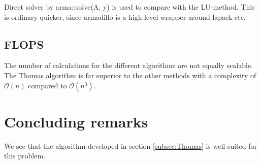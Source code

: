 \documentclass[11pt,a4paper,english,final]{article}
\numberwithin{equation}{section}
\newcommand{\bigO}[1]{\mathcal{O}\left( #1 \right)}
\begin{document}
Direct solver by arma::solve(A, y) is used to compare with the LU-method.
This is ordinary quicker, since armadillo is a high-level wrapper around
lapack etc.

\subsection{FLOPS}
The number of calculations for the different algorithms are not equally
scalable. The Thomas algorithm is far superior to the other methods
with a complexity of $\bigO{n}$ compared to $\bigO{n^3}$.

\section{Concluding remarks}


We see that the algorithm developed in section \ref{subsec:Thomas} is 
well suited for this problem.
\end{document}
